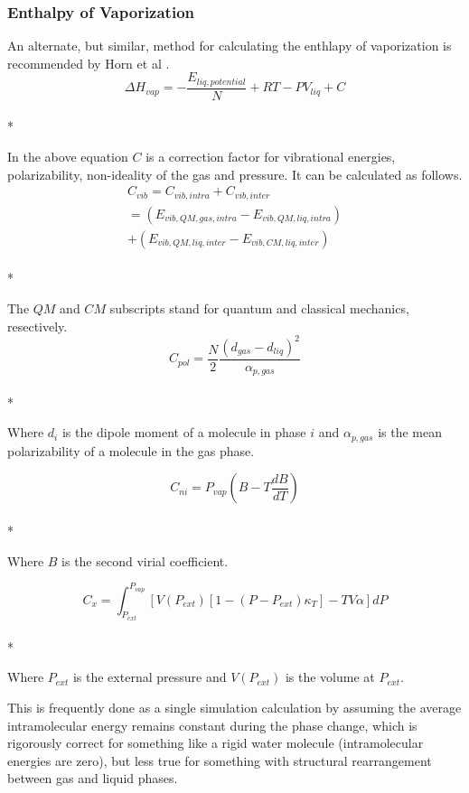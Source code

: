 \documentclass[aps,pre,twocolumn,nofootinbib,superscriptaddress,linenumbers,10pt, draft,tightenlines]{revtex4-1}
\begin{document}
\subsubsection{Enthalpy of Vaporization}
An alternate, but similar, method for calculating the enthlapy of vaporization is recommended by Horn et al \cite{horn}.
\begin{equation}\Delta H_{vap} = -\frac{E_{liq, potential}}{N} + R T - P V_{liq} + C\end{equation}\\*

In the above equation $C$ is a correction factor for vibrational energies, polarizability, non-ideality of the gas and pressure. It can be calculated as follows.
\begin{multline}
C_{vib} = C_{vib,intra} + C_{vib,inter} \\ = \left(E_{vib,QM,gas,intra} - E_{vib,QM,liq,intra}\right) \\ + \left(E_{vib,QM,liq,inter} - E_{vib,CM,liq,inter}\right)
\end{multline}\\*

The $QM$ and $CM$ subscripts stand for quantum and classical mechanics, resectively. 
\begin{equation}C_{pol} = \frac{N}{2} \frac{\left(d_{gas} - d_{liq}\right)^2}{\alpha_{p,gas}}\end{equation}\\*

Where $d_i$ is the dipole moment of a molecule in phase $i$ and $\alpha_{p,gas}$ is the mean polarizability of a molecule in the gas phase.

\begin{equation}C_{ni} = P_{vap} \left(B - T \frac{dB}{dT}\right)\end{equation}\\*

Where $B$ is the second virial coefficient.

\begin{equation}C_x = \int_{P_{ext}}^{P_{vap}} \left[V\left(P_{ext}\right)\left[1 - \left(P - P_{ext}\right) \kappa_T\right] - T V \alpha\right] dP\end{equation}\\*

Where $P_{ext}$ is the external pressure and $V\left(P_{ext}\right)$ is the volume at $P_{ext}$. 

This is frequently done as a single simulation calculation by assuming
the average intramolecular energy remains constant during the phase
change, which is rigorously correct for something like a rigid water
molecule (intramolecular energies are zero), but less true for
something with structural rearrangement between gas and liquid phases. 
\end{document}
